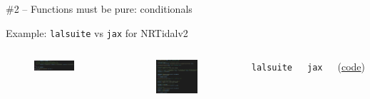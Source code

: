 \documentclass[usenames,dvipsnames,t]{beamer}
\begin{document}
\begin{frame}{\#2 -- Functions must be pure: conditionals}

  Example: \texttt{lalsuite} vs \texttt{jax} for NRTidalv2

  \vspace{-2mm}

  \begin{columns}

    \begin{figure}[H]
      \centering
      \includegraphics[width=0.8\textwidth]{Figures/lalsuite_code.png}
    \end{figure}
  
    \begin{figure}[H]
      \centering
      \includegraphics[width=0.8\textwidth]{Figures/ripple_code.png}
    \end{figure}
  

    \vspace{1cm}

    \texttt{lalsuite} 

    \vspace{3cm}

    \texttt{jax} 

    (\href{https://github.com/ThibeauWouters/ripple/blob/main/src/ripple/waveforms/utils_tidal.py}{code})
  
  \end{columns}

\end{frame}
\end{document}
